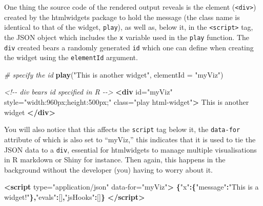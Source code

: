 \documentclass[
  10pt,
]{krantz}
\makeatletter
\newenvironment{Shaded}{\begin{snugshade}}{\end{snugshade}}
\newcommand{\CommentTok}[1]{\textcolor[rgb]{0.37,0.37,0.37}{\textit{#1}}}
\newcommand{\DataTypeTok}[1]{\textcolor[rgb]{0.27,0.27,0.27}{#1}}
\newcommand{\KeywordTok}[1]{\textcolor[rgb]{0.27,0.27,0.27}{\textbf{#1}}}
\newcommand{\NormalTok}[1]{#1}
\newcommand{\OperatorTok}[1]{\textcolor[rgb]{0.43,0.43,0.43}{\textbf{#1}}}
\newcommand{\OtherTok}[1]{\textcolor[rgb]{0.37,0.37,0.37}{#1}}
\newcommand{\StringTok}[1]{\textcolor[rgb]{0.5,0.5,0.5}{#1}}
\newenvironment{kframe}{%
\medskip{}
\setlength{\fboxsep}{.8em}
 \def\at@end@of@kframe{}%
 \ifinner\ifhmode%
  \def\at@end@of@kframe{\end{minipage}}%
  \begin{minipage}{\columnwidth}%
 \fi\fi%
 \def\FrameCommand##1{\hskip\@totalleftmargin \hskip-\fboxsep
 \colorbox{shadecolor}{##1}\hskip-\fboxsep
     \hskip-\linewidth \hskip-\@totalleftmargin \hskip\columnwidth}%
 \MakeFramed {\advance\hsize-\width
   \@totalleftmargin\z@ \linewidth\hsize
   \@setminipage}}%
 {\par\unskip\endMakeFramed%
 \at@end@of@kframe}
\renewenvironment{Shaded}{\begin{kframe}}{\end{kframe}}
\makeatother
\begin{document}
One thing the source code of the rendered output reveals is the element (\texttt{\textless{}div\textgreater{}}) created by the htmlwidgets package to hold the message (the class name is identical to that of the widget, \texttt{play}), as well as, below it, in the \texttt{\textless{}script\textgreater{}} tag, the JSON object which includes the \texttt{x} variable used in the \texttt{play} function. The \texttt{div} created bears a randomly generated \texttt{id} which one can define when creating the widget using the \texttt{elementId} argument.

\begin{Shaded}
\begin{Highlighting}[]
\CommentTok{\# specify the id}
\KeywordTok{play}\NormalTok{(}\StringTok{"This is another widget"}\NormalTok{, }\DataTypeTok{elementId =} \StringTok{"myViz"}\NormalTok{)}
\end{Highlighting}
\end{Shaded}

\begin{Shaded}
\begin{Highlighting}[]
\CommentTok{<!{-}{-} div bears id specified in R {-}{-}>}
\KeywordTok{<div}\OtherTok{ id=}\StringTok{"myViz"} 
\OtherTok{  style=}\StringTok{"width:960px;height:500px;"} 
\OtherTok{  class=}\StringTok{"play html{-}widget"}\KeywordTok{>}
\NormalTok{  This is another widget}
\KeywordTok{</div>}
\end{Highlighting}
\end{Shaded}

You will also notice that this affects the \texttt{script} tag below it, the \texttt{data-for} attribute of which is also set to ``myViz,'' this indicates that it is used to tie the JSON data to a \texttt{div}, essential for htmlwidgets to manage multiple visualisations in R markdown or Shiny for instance. Then again, this happens in the background without the developer (you) having to worry about it.

\begin{Shaded}
\begin{Highlighting}[]
\KeywordTok{<script}\OtherTok{ type=}\StringTok{"application/json"} 
\OtherTok{  data{-}for=}\StringTok{"myViz"}\KeywordTok{>}
  \OperatorTok{\{}\StringTok{"x"}\OperatorTok{:\{}\StringTok{"message"}\OperatorTok{:}\StringTok{"This is a widget!"}\OperatorTok{\},}\StringTok{"evals"}\OperatorTok{:}\NormalTok{[]}\OperatorTok{,}\StringTok{"jsHooks"}\OperatorTok{:}\NormalTok{[]}\OperatorTok{\}}
\KeywordTok{</script>}
\end{Highlighting}
\end{Shaded}
\end{document}
